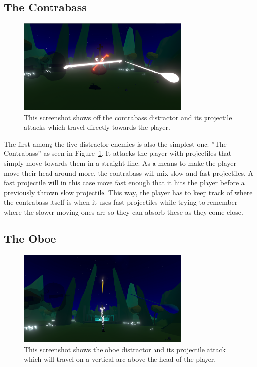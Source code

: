 \subsection{The Contrabass}
\begin{figure}[tbph]
    \centering
    \includegraphics[width=0.75\textwidth]{figures/screenshots/contrabass.png}
    \caption[The Contrabass Distractor]{This screenshot shows off the contrabass distractor and its projectile attacks which travel directly towards the player.}
    \label{fig:contrabassDistractor}
\end{figure}
The first among the five distractor enemies is also the simplest one: ''The Contrabass'' as seen in Figure~\ref{fig:contrabassDistractor}. It attacks the player with projectiles that simply move towards them in a straight line. As a means to make the player move their head around more, the contrabass will mix slow and fast projectiles. A fast projectile will in this case move fast enough that it hits the player before a previously thrown slow projectile. This way, the player has to keep track of where the contrabass itself is when it uses fast projectiles while trying to remember where the slower moving ones are so they can absorb these as they come close. 
 
\subsection{The Oboe}
\begin{figure}[tbph]
    \centering
    \includegraphics[width=0.75\textwidth]{figures/screenshots/oboe.png}
    \caption[The Oboe Distractor]{This screenshot shows the oboe distractor and its projectile attack which will travel on a vertical arc above the head of the player.}
    \label{fig:oboeDistractor}
\end{figure}

